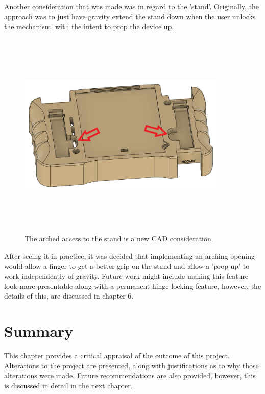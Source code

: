 Another consideration that was made was in regard to the 'stand'.
Originally, the approach was to just have gravity extend the stand down when the user unlocks the mechanism, with the intent to prop the device up.

\begin{figure} [h]
    \centering
    \includegraphics[width=10cm,height=10cm,keepaspectratio]{Figures/stand_new.png}
    \caption{The arched access to the stand is a new CAD consideration.}
    \label{fig:NewStand}
\end{figure}

After seeing it in practice, it was decided that implementing an arching opening would allow a finger to get a better grip on the stand and allow a 'prop up' to work independently of gravity.
Future work might include making this feature look more presentable along with a permanent hinge locking feature, however, the details of this, are discussed in chapter 6.


\section{Summary}
This chapter provides a critical appraisal of the outcome of this project.
Alterations to the project are presented, along with justifications as to why those alterations were made.
Future recommendations are also provided, however, this is discussed in detail in the next chapter.